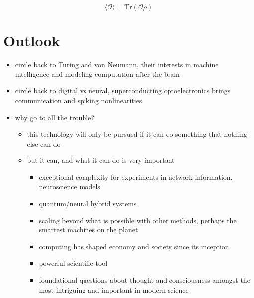 \documentclass[twocolumn]{article}
\begin{document}
\begin{equation}
\label{eq:density_matrix}
\langle \mathcal{O}\rangle = \mathrm{Tr}(\mathcal{O}\rho)
\end{equation}


\section{\label{sec:outlook}Outlook}

\begin{itemize}

\item circle back to Turing and von Neumann, their interests in machine intelligence and modeling computation after the brain
\item circle back to digital vs neural, superconducting optoelectronics brings communication and spiking nonlinearities

\item why go to all the trouble?
\begin{itemize}
\item this technology will only be pursued if it can do something that nothing else can do
\item but it can, and what it can do is very important
\begin{itemize}
\item exceptional complexity for experiments in network information, neuroscience models
\item quantum/neural hybrid systems
\item scaling beyond what is possible with other methods, perhaps the smartest machines on the planet
\item computing has shaped economy and society since its inception
\item powerful scientific tool
\item foundational questions about thought and consciousness amongst the most intriguing and important in modern science
\end{itemize}

\end{itemize}

\end{itemize}
\end{document}
